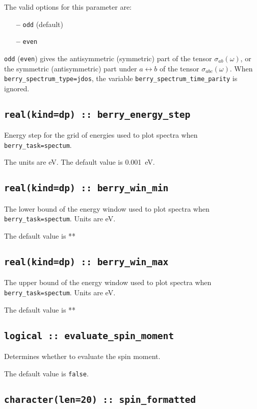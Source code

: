 The valid options for this parameter are:
\begin{itemize}
\item[{\bf --}]  \verb#odd# (default) 
\item[{\bf --}]  \verb#even#  
\end{itemize}

\verb#odd# (\verb#even#) gives the antisymmetric (symmetric) part of
the tensor $\sigma_{ab}(\omega)$, or the symmetric (antisymmetric)
part under $a\leftrightarrow b$ of the tensor $\sigma_{abc}(\omega)$.
When \texttt{berry\_spectrum\_type=jdos}, the variable
\texttt{berry\_spectrum\_time\_parity} is ignored.

\subsection[berry\_energy\_step]{\tt real(kind=dp) :: berry\_energy\_step}
Energy step for the grid of energies used to plot spectra when {\tt berry\_task=spectum}.

The units are eV.
The default value is 0.001~eV.

\subsection[berry\_win\_min]{\tt real(kind=dp) :: berry\_win\_min}
The lower bound of the energy window  used to plot spectra when {\tt berry\_task=spectum}.
Units are eV.

The default value is **

\subsection[berry\_win\_max]{\tt real(kind=dp) :: berry\_win\_max}
The upper bound of the energy window used to plot spectra when {\tt berry\_task=spectum}.
Units are eV.

The default value is **


\subsection[evaluate\_spin\_moment]{\tt logical :: evaluate\_spin\_moment}
Determines whether to evaluate the spin moment.

The default value is \verb#false#.

\subsection[spin\_formated]{\tt character(len=20) :: spin\_formatted}


